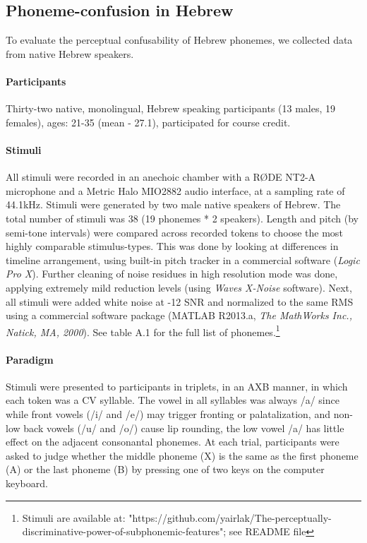 \subsection{Phoneme-confusion in Hebrew}
To evaluate the perceptual confusability of Hebrew phonemes, we collected data from native Hebrew speakers.

\paragraph{Participants}
Thirty-two native, monolingual, Hebrew speaking participants (13 males, 19 females), ages: 21-35 (mean - 27.1), participated for course credit.

\paragraph{Stimuli}
All stimuli were recorded in an anechoic chamber with a RØDE NT2-A microphone and a Metric Halo MIO2882 audio interface, at a sampling rate of 44.1kHz. Stimuli were generated by two male native speakers of Hebrew. The total number of stimuli was 38 (19 phonemes * 2 speakers). Length and pitch (by semi-tone intervals) were compared across recorded tokens to choose the most highly comparable stimulus-types. This was done by looking at differences in timeline arrangement, using built-in pitch tracker in a commercial software (\textit{Logic Pro X}). Further cleaning of noise residues in high resolution mode was done, applying extremely mild reduction levels (using \textit{Waves X-Noise} software). Next, all stimuli were added white noise at -12 SNR and normalized to the same RMS using a commercial software package (MATLAB R2013.a, \textit{The MathWorks Inc., Natick, MA, 2000}). See table A.1 for the full list of phonemes.\footnote{Stimuli are available at: "https://github.com/yairlak/The-perceptually-discriminative-power-of-subphonemic-features"; see README file}

\paragraph{Paradigm}
Stimuli were presented to participants in triplets, in an AXB manner, in which each token was a CV syllable. The vowel in all syllables was always /a/ since while front vowels (/i/ and /e/) may trigger fronting or palatalization, and non-low back vowels (/u/ and /o/) cause lip rounding, the low vowel /a/ has little effect on the adjacent consonantal phonemes. At each trial, participants were asked to judge whether the middle phoneme (X) is the same as the first phoneme (A) or the last phoneme (B) by pressing one of two keys on the computer keyboard.

